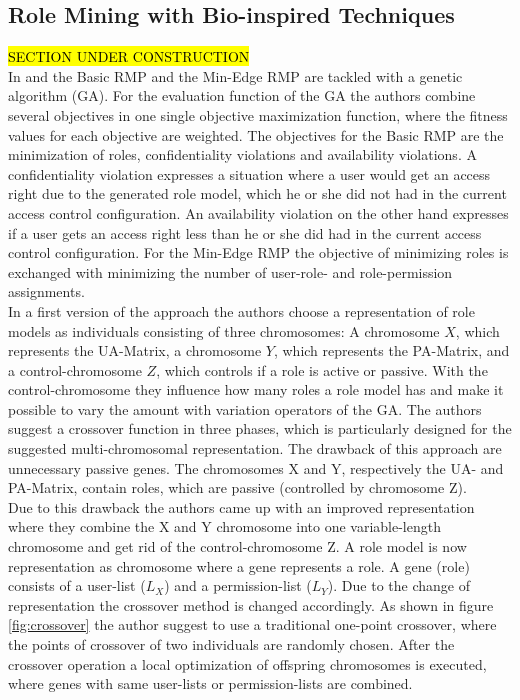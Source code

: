 \subsection{Role Mining with Bio-inspired Techniques}
\hl{SECTION UNDER CONSTRUCTION}\\
In \cite{Igor} and \cite{saenko2012design} the Basic RMP and the Min-Edge RMP are tackled with a genetic algorithm (GA). For the evaluation function of the GA the authors combine several objectives in one single objective maximization function, where the fitness values for each objective are weighted. The objectives for the Basic RMP are the minimization of roles, confidentiality violations and availability violations. A confidentiality violation expresses a situation where a user would get an access right due to the generated role model, which he or she did not had in the current access control configuration. An availability violation on the other hand expresses if a user gets an access right less than he or she did had in the current access control configuration. For the Min-Edge RMP the objective of minimizing roles is exchanged with minimizing the number of user-role- and role-permission assignments.\\
In a first version of the approach the authors choose a representation of role models as individuals consisting of three chromosomes: A chromosome $X$, which represents the UA-Matrix, a chromosome $Y$, which represents the PA-Matrix, and a control-chromosome $Z$, which controls if a role is active or passive. With the control-chromosome they influence how many roles a role model has and make it possible to vary the amount with variation operators of the GA. The authors suggest a crossover function in three phases, which is particularly designed for the suggested multi-chromosomal representation. The drawback of this approach are unnecessary passive genes. The chromosomes X and Y, respectively the UA- and PA-Matrix, contain roles, which are passive (controlled by chromosome Z).\\
Due to this drawback the authors came up with an improved representation where they combine the X and Y chromosome into one variable-length chromosome and get rid of the control-chromosome Z. A role model is now representation as chromosome where a gene represents a role. A gene (role) consists of a user-list ($L_X$) and a permission-list ($L_Y$). Due to the change of representation the crossover method is changed accordingly. As shown in figure \ref{fig:crossover} the author suggest to use a traditional one-point crossover, where the points of crossover of two individuals are randomly chosen. After the crossover operation a local optimization of offspring chromosomes is executed, where genes with same user-lists or permission-lists are combined.
